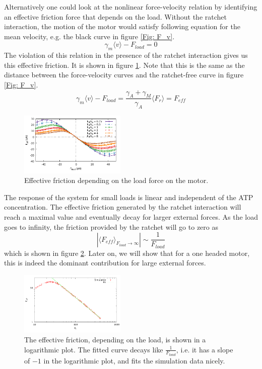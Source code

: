 \documentclass[aps,pre,twocolumn,showpacs,showkeys,a4paper]{revtex4}
\begin{document}
Alternatively one could look at the nonlinear force-velocity relation by identifying an effective friction force that depends on the load. 
Without the ratchet interaction, the motion of the motor would satisfy following equation for the mean velocity, e.g. the black curve in figure \ref{Fig: F_v}.
\begin{equation*}
\gamma_{m}\langle v\rangle - F_{load} = 0
\end{equation*}
The violation of this relation in the presence of the ratchet interaction gives us this effective friction. 
It is shown in figure \ref{Fig: effective_friction}. 
Note that this is the same as the distance between the force-velocity curves and the ratchet-free curve in figure \ref{Fig: F_v}.
\begin{equation*}
\gamma_{m} \langle v \rangle - F_{load} = \frac{\gamma_A + \gamma_M}{\gamma_A} \langle F_r \rangle = F_{eff}
\end{equation*}
\begin{figure}[t]
\centering
\includegraphics[width=0.45\textwidth,height=!]{effective_friction}
\caption{Effective friction depending on the load force on the motor.}
\label{Fig: effective_friction}
\end{figure}
The response of the system for small loads is linear and independent of the ATP concentration. 
The effective friction generated by the ratchet interaction will reach a maximal value and eventually decay for larger external forces. 
As the load goes to infinity, the friction provided by the ratchet will go to zero as 
\begin{equation*}
\left| \langle F_{eff} \rangle_{F_{load}\rightarrow\infty} \right| \sim \frac{1}{F_{load}}
\end{equation*} 
which is shown in figure \ref{Fig: eff_frict_decay}. 
Later on, we will show that for a one headed motor, this is indeed the dominant contribution for large external forces.  
\begin{figure}[b]
\centering
\includegraphics[width=0.45\textwidth,height=!]{eff_frict_decay}
\caption{The effective friction, depending on the load, is shown in a logarithmic plot. 
The fitted curve decays like $\frac{1}{F_{load}}$, i.e. it has a slope of $-1$ in the logarithmic plot, and fits the simulation data nicely.}
\label{Fig: eff_frict_decay}
\end{figure}
\end{document}
